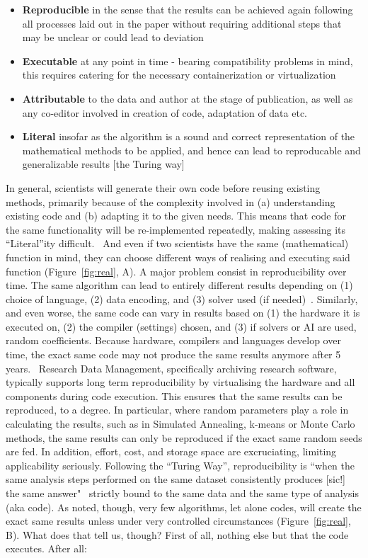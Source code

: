 \documentclass{eceasst}
\begin{document}
\begin{itemize}
    \item \textbf{Reproducible} in the sense that the results can be achieved again following all processes laid out in the paper without requiring additional steps that may be unclear or could lead to deviation
    \item \textbf{Executable} at any point in time - bearing compatibility problems in mind, this requires catering for the necessary containerization or virtualization
    \item \textbf{Attributable} to the data and author at the stage of publication, as well as any co-editor involved in creation of code, adaptation of data etc.
    \item \textbf{Literal} insofar as the algorithm is a sound and correct representation of the mathematical methods to be applied, and hence can lead to reproducable and generalizable results [the Turing way]
\end{itemize}

In general, scientists will generate their own code before reusing existing methods, primarily because of the complexity involved in (a) understanding existing code and (b) adapting it to the given needs. This means that code for the same functionality will be re-implemented repeatedly, making assessing its “Literal”ity difficult.  And even if two scientists have the same (mathematical) function in mind, they can choose different ways of realising and executing said function (Figure~\ref{fig:real}, A). A major problem consist in reproducibility over time. The same algorithm can lead to entirely different results depending on (1) choice of language, (2) data encoding, and (3) solver used (if needed)~\cite{hennessy_new_2019}. Similarly, and even worse, the same code can vary in results based on (1) the hardware it is executed on, (2) the compiler (settings) chosen, and (3) if solvers or AI are used, random coefficients. Because hardware, compilers and languages develop over time, the exact same code may not produce the same results anymore after 5 years.  Research Data Management, specifically archiving research software, typically supports long term reproducibility by virtualising the hardware and all components during code execution. This ensures that the same results can be reproduced, to a degree. In particular, where random parameters play a role in calculating the results, such as in Simulated Annealing, k-means or Monte Carlo methods, the same results can only be reproduced if the exact same random seeds are fed. In addition, effort, cost, and storage space are excruciating, limiting applicability seriously. Following the “Turing Way”, reproducibility is “when the same analysis steps performed on the same dataset consistently produces [sic!] the same answer"~\cite{the_turing_way_community_turing_2025} strictly bound to the same data and the same type of analysis (aka code). As noted, though, very few algorithms, let alone codes, will create the exact same results unless under very controlled circumstances (Figure~\ref{fig:real}, B). What does that tell us, though? First of all, nothing else but that the code executes. After all: 
\end{document}
